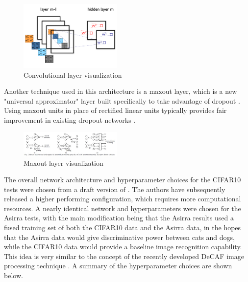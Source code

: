 \documentclass[journal]{IEEEtran}
\begin{document}
\begin{figure}[h!]
\centering
  \includegraphics[width=0.45\textwidth]{convolutional.png}
  \caption{Convolutional layer visualization \cite{LeNetTut}}
\label{fig:convolutional}
\end{figure}

Another technique used in this architecture is a maxout layer, which is a new
"universal approximator" layer built specifically to take advantage of dropout
\cite{Dropout}. Using maxout units in place of rectified linear units typically
provides fair improvement in existing dropout networks \cite{Maxout}. 

\begin{figure}[h!]
\centering
  \includegraphics[width=0.45\textwidth]{maxout.png}
  \caption{Maxout layer visualization \cite{Lowresource}}
\label{fig:maxout}
\end{figure}

The overall network architecture and hyperparameter choices for the CIFAR10 
tests were chosen from a draft version of \cite{Maxout}. The authors have 
subsequently released a higher performing configuration, which requires more
computational resources. A nearly identical network and hyperparameters were 
chosen for the Asirra tests, with the main modification being that the Asirra
results used a fused training set of both the CIFAR10 data and the Asirra data,
in the hopes that the Asirra data would give discriminative power between cats
and dogs, while the CIFAR10 data would provide a baseline image recognition 
capability. This idea is very similar to the concept of the recently developed
DeCAF image processing technique \cite{DeCAF}. A summary of the hyperparameter
choices are shown below.
\end{document}
